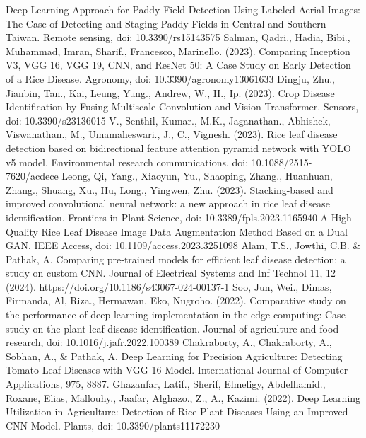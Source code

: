 \documentclass[conference]{IEEEtran}
\begin{document}
\begin{thebibliography}{00}
 Deep Learning Approach for Paddy Field Detection Using Labeled Aerial Images: The Case of Detecting and Staging Paddy Fields in Central and Southern Taiwan. Remote sensing,  doi: 10.3390/rs15143575
 Salman, Qadri., Hadia, Bibi., Muhammad, Imran, Sharif., Francesco, Marinello. (2023). Comparing Inception V3, VGG 16, VGG 19, CNN, and ResNet 50: A Case Study on Early Detection of a Rice Disease. Agronomy, doi: 10.3390/agronomy13061633
 Dingju, Zhu., Jianbin, Tan., Kai, Leung, Yung., Andrew, W., H., Ip. (2023). Crop Disease Identification by Fusing Multiscale Convolution and Vision Transformer. Sensors,  doi: 10.3390/s23136015
 V., Senthil, Kumar., M.K., Jaganathan., Abhishek, Viswanathan., M., Umamaheswari., J., C., Vignesh. (2023). Rice leaf disease detection based on bidirectional feature attention pyramid network with YOLO v5 model. Environmental research communications,  doi: 10.1088/2515-7620/acdece
 Leong, Qi, Yang., Xiaoyun, Yu., Shaoping, Zhang., Huanhuan, Zhang., Shuang, Xu., Hu, Long., Yingwen, Zhu. (2023). Stacking-based and improved convolutional neural network: a new approach in rice leaf disease identification. Frontiers in Plant Science,  doi: 10.3389/fpls.2023.1165940
 A High-Quality Rice Leaf Disease Image Data Augmentation Method Based on a Dual GAN. IEEE Access,  doi: 10.1109/access.2023.3251098
 Alam, T.S., Jowthi, C.B. \& Pathak, A. Comparing pre-trained models for efficient leaf disease detection: a study on custom CNN. Journal of Electrical Systems and Inf Technol 11, 12 (2024). https://doi.org/10.1186/s43067-024-00137-1
 Soo, Jun, Wei., Dimas, Firmanda, Al, Riza., Hermawan, Eko, Nugroho. (2022). Comparative study on the performance of deep learning implementation in the edge computing: Case study on the plant leaf disease identification. Journal of agriculture and food research,  doi: 10.1016/j.jafr.2022.100389
 Chakraborty, A., Chakraborty, A., Sobhan, A., \& Pathak, A. Deep Learning for Precision Agriculture: Detecting Tomato Leaf Diseases with VGG-16 Model. International Journal of Computer Applications, 975, 8887.
 Ghazanfar, Latif., Sherif, Elmeligy, Abdelhamid., Roxane, Elias, Mallouhy., Jaafar, Alghazo., Z., A., Kazimi. (2022). Deep Learning Utilization in Agriculture: Detection of Rice Plant Diseases Using an Improved CNN Model. Plants,  doi: 10.3390/plants11172230
\end{thebibliography}
\end{document}
